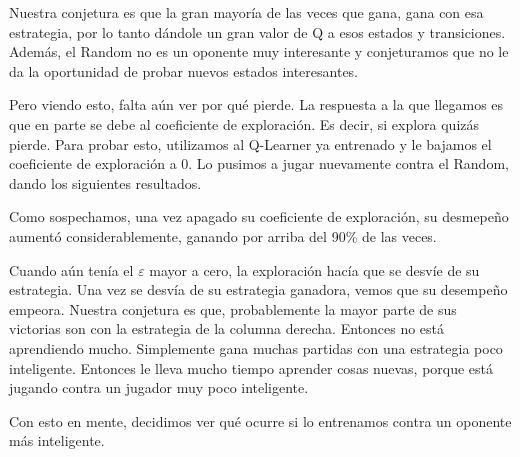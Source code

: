 Nuestra conjetura es que la gran mayoría de las veces que gana, gana con esa estrategia, por lo tanto dándole un gran valor de Q a esos estados y transiciones. Además, el Random no es un oponente muy interesante y conjeturamos que no le da la oportunidad de probar nuevos estados interesantes.

Pero viendo esto, falta aún ver por qué pierde. La respuesta a la que llegamos es que en parte se debe al coeficiente de exploración. Es decir, si explora quizás pierde. Para probar esto, utilizamos al Q-Learner ya entrenado y le bajamos el coeficiente de exploración a 0. Lo pusimos a jugar nuevamente contra el Random, dando los siguientes resultados.



Como sospechamos, una vez apagado su coeficiente de exploración, su desmepeño aumentó considerablemente, ganando por arriba del 90\% de las veces.

Cuando aún tenía el $\varepsilon$ mayor a cero, la exploración hacía que se desvíe de su estrategia. Una vez se desvía de su estrategia ganadora, vemos que su desempeño empeora. Nuestra conjetura es que, probablemente la mayor parte de sus victorias son con la estrategia de la columna derecha. Entonces no está aprendiendo mucho. Simplemente gana muchas partidas con una estrategia poco inteligente. Entonces le lleva mucho tiempo aprender cosas nuevas, porque está jugando contra un jugador muy poco inteligente.

Con esto en mente, decidimos ver qué ocurre si lo entrenamos contra un oponente más inteligente.
